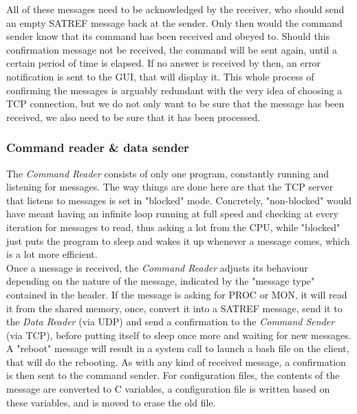 \documentclass{themeensg}
\begin{document}
All of these messages need to be acknowledged by the receiver, who should send an empty SATREF message back at the sender. Only then would the command sender know that its command has been received and obeyed to. Should this confirmation message not be received, the command will be sent again, until a certain period of time is elapsed. If no answer is received by then, an error notification is sent to the GUI, that will display it. This whole process of confirming the messages is arguably redundant with the very idea of choosing a TCP connection, but we do not only want to be sure that the message has been received, we also need to be sure that it has been processed.

\subsubsection{Command reader \& data sender}

The \textit{Command Reader} consists of only one program, constantly running and listening for messages. The way things are done here are that the TCP server that listens to messages is set in "blocked" mode. Concretely, "non-blocked" would have meant having an infinite loop running at full speed and checking at every iteration for messages to read, thus asking a lot from the CPU, while "blocked" just puts the program to sleep and wakes it up whenever a message comes, which is a lot more efficient.\\

Once a message is received, the \textit{Command Reader} adjusts its behaviour depending on the nature of the message, indicated by the "message type" contained in the header. If the message is asking for PROC or MON, it will read it from the shared memory, once, convert it into a SATREF message, send it to the \textit{Data Reader} (via UDP) and send a confirmation to the \textit{Command Sender} (via TCP), before putting itself to sleep once more and waiting for new messages.
A "reboot" message will result in a system call to launch a bash file on the client, that will do the rebooting. As with any kind of received message, a confirmation is then sent to the command sender.
For configuration files, the contents of the message are converted to C variables, a configuration file is written based on these variables, and is moved to erase the old file.\\
\end{document}
